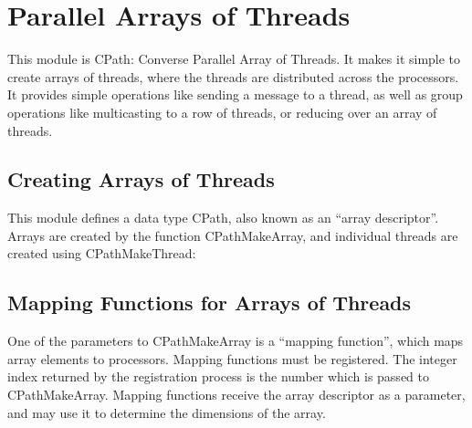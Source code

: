 \chapter{Parallel Arrays of Threads}

This module is CPath: Converse Parallel Array of Threads.  It makes it
simple to create arrays of threads, where the threads are distributed
across the processors.  It provides simple operations like sending a
message to a thread, as well as group operations like multicasting to
a row of threads, or reducing over an array of threads.

\section{Creating Arrays of Threads}

This module defines a data type CPath, also known as an ``array
descriptor''.  Arrays are created by the function CPathMakeArray,
and individual threads are created using CPathMakeThread:



\section{Mapping Functions for Arrays of Threads}

One of the parameters to CPathMakeArray is a ``mapping function'',
which maps array elements to processors.  Mapping functions must be
registered.  The integer index returned by the registration process is
the number which is passed to CPathMakeArray.  Mapping functions
receive the array descriptor as a parameter, and may use it to determine
the dimensions of the array.



